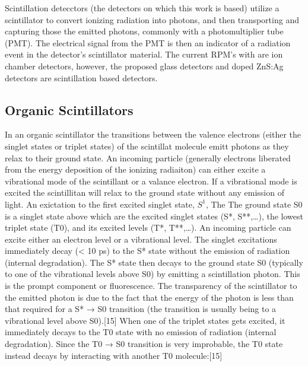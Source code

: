 Scintillation detecctors (the detectors on which this work is based) utilize a scintillator to convert ionizing radiation into photons, and then transporting and capturing those the emitted photons, commonly with a photomultiplier tube (PMT).
The electrical signal from the PMT is then an indicator of a radiation event in the detector's scintillator material.
The current RPM's with  are ion chamber detectors, however, the proposed  glass detectors and  doped ZnS:Ag detectors are scintillation based detectors. 

\subsection{Organic Scintillators}
In an organic scintillator the transitions between the valence electrons (either the singlet states or triplet states) of the scintillat molecule emitt photons as they relax to their ground state.
An incoming particle (generally electrons liberated from the energy deposition of the ionizing radiaiton) can either excite a vibrational mode of the scintillant or a valance electron.
If a vibrational mode is excited the scintillitan will relax to the ground state without any emission of light.
An exictation to the first excited singlet state, $S^1$,  
The
The ground state S0 is a singlet state above which are the excited singlet states (S*, S**,…), the lowest triplet state (T0), and its excited levels (T*, T**,…). 
An incoming particle can excite either an electron level or a vibrational level. The singlet excitations immediately decay (< 10 ps) to the S* state without the emission of radiation (internal degradation). The S* state then decays to the ground state S0 (typically to one of the vibrational levels above S0) by emitting a scintillation photon. This is the prompt component or fluorescence. The transparency of the scintillator to the emitted photon is due to the fact that the energy of the photon is less than that required for a S* → S0 transition (the transition is usually being to a vibrational level above S0).[15]
When one of the triplet states gets excited, it immediately decays to the T0 state with no emission of radiation (internal degradation). Since the T0 → S0 transition is very improbable, the T0 state instead decays by interacting with another T0 molecule:[15]

